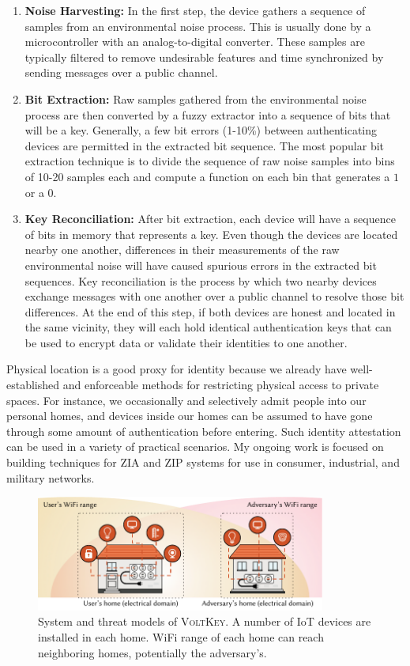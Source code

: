 \documentclass[10pt,onecolumn]{article}
\begin{document}
\begin{enumerate}%
    \item \textbf{Noise Harvesting:} In the first step, the device gathers a sequence of samples from an environmental noise process.
    This is usually done by a microcontroller with an analog-to-digital converter.
    These samples are typically filtered to remove undesirable features and time synchronized by sending messages over a public channel.
    \item \textbf{Bit Extraction:} Raw samples gathered from the environmental noise process are then converted by a fuzzy extractor into a sequence of bits that will be a key.
    Generally, a few bit errors (1-10\%) between authenticating devices are permitted in the extracted bit sequence.
    The most popular bit extraction technique is to divide the sequence of raw noise samples into bins of 10-20 samples each and compute a function on each bin that generates a $1$ or a $0$.
    \item \textbf{Key Reconciliation:} After bit extraction, each device will have a sequence of bits in memory that represents a key.
    Even though the devices are located nearby one another, differences in their measurements of the raw environmental noise will have caused spurious errors in the extracted bit sequences.
    Key reconciliation is the process by which two nearby devices exchange messages with one another over a public channel to resolve those bit differences.
    At the end of this step, if both devices are honest and located in the same vicinity, they will each hold identical authentication keys that can be used to encrypt data or validate their identities to one another.
\end{enumerate}


Physical location is a good proxy for identity because we already have well-established and enforceable methods for restricting physical access to private spaces.
For instance, we occasionally and selectively admit people into our personal homes, and devices inside our homes can be assumed to have gone through some amount of authentication before entering.
Such identity attestation can be used in a variety of practical scenarios.
My ongoing work is focused on building techniques for ZIA and ZIP systems for use in consumer, industrial, and military networks.

\begin{figure}
\centering
\includegraphics[width=3.75in]{figures/introduction.pdf}
\caption{System and threat models of \textsc{VoltKey}. A number of IoT devices are installed in each home. WiFi range of each home can reach neighboring homes, potentially the adversary's.}
\label{fig:introduction}
\end{figure}
\end{document}
